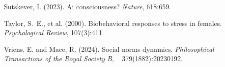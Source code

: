\begin{thebibliography}{}
Sutskever, I. (2023).
\newblock Ai consciousness?
\newblock \emph{Nature}, 618:659.

Taylor, S.~E., et al. (2000).
\newblock Biobehavioral responses to stress in females.
\newblock \emph{Psychological Review}, 107(3):411.

Vriens, E. and Mace, R. (2024).
\newblock Social norms dynamics.
\newblock \emph{Philosophical Transactions of the Royal Society B},
  379(1882):20230192.

\end{thebibliography}
